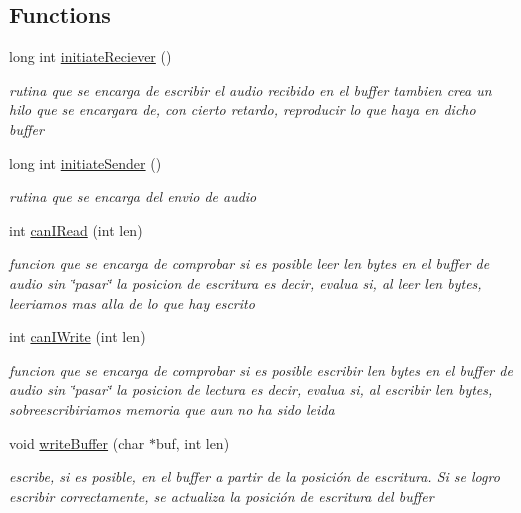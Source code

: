 \subsection*{Functions}
\begin{DoxyCompactItemize}
\item 
long int \hyperlink{_g-2301-05-_p2-audio_8h_a4d496518d4597c6f8133d109caaf988a}{initiate\-Reciever} ()
\begin{DoxyCompactList}\small\item\em rutina que se encarga de escribir el audio recibido en el buffer tambien crea un hilo que se encargara de, con cierto retardo, reproducir lo que haya en dicho buffer \end{DoxyCompactList}\item 
long int \hyperlink{_g-2301-05-_p2-audio_8h_aba2d08b3de022fdec5162252fe5d3dd8}{initiate\-Sender} ()
\begin{DoxyCompactList}\small\item\em rutina que se encarga del envio de audio \end{DoxyCompactList}\item 
int \hyperlink{_g-2301-05-_p2-audio_8h_a70e78aa07a05a7d1d6688220b711fe0d}{can\-I\-Read} (int len)
\begin{DoxyCompactList}\small\item\em funcion que se encarga de comprobar si es posible leer len bytes en el buffer de audio sin \char`\"{}pasar\char`\"{} la posicion de escritura es decir, evalua si, al leer len bytes, leeriamos mas alla de lo que hay escrito \end{DoxyCompactList}\item 
int \hyperlink{_g-2301-05-_p2-audio_8h_acddb1a586a8305d216deca1d3bd07c29}{can\-I\-Write} (int len)
\begin{DoxyCompactList}\small\item\em funcion que se encarga de comprobar si es posible escribir len bytes en el buffer de audio sin \char`\"{}pasar\char`\"{} la posicion de lectura es decir, evalua si, al escribir len bytes, sobreescribiriamos memoria que aun no ha sido leida \end{DoxyCompactList}\item 
void \hyperlink{_g-2301-05-_p2-audio_8h_a197e00439b5ca776c65aba209872f76a}{write\-Buffer} (char $\ast$buf, int len)
\begin{DoxyCompactList}\small\item\em escribe, si es posible, en el buffer a partir de la posición de escritura. Si se logro escribir correctamente, se actualiza la posición de escritura del buffer \end{DoxyCompactList}\item 

\end{DoxyCompactItemize}
